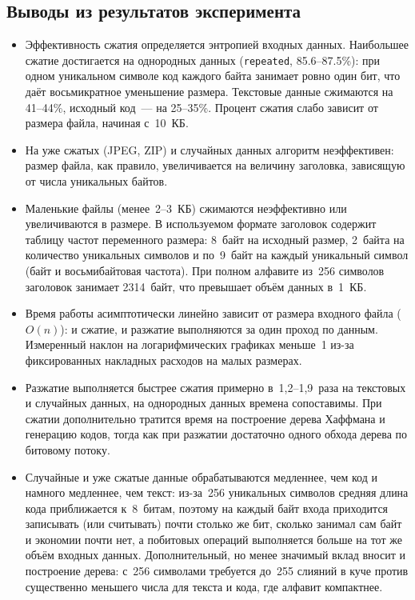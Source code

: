 \documentclass[a4paper]{article}
\begin{document}
\subsection{Выводы из результатов эксперимента}

\begin{itemize}
    \item Эффективность сжатия определяется энтропией входных данных.
    Наибольшее сжатие достигается на однородных данных
    (\texttt{repeated}, 85.6--87.5\%): при одном уникальном символе
    код каждого байта занимает ровно один бит, что даёт восьмикратное
    уменьшение размера. Текстовые данные сжимаются на 41--44\%,
    исходный код~--- на 25--35\%. Процент сжатия слабо зависит
    от размера файла, начиная с~10~КБ.

    \item На уже сжатых (JPEG, ZIP) и случайных данных алгоритм
    неэффективен: размер файла, как правило, увеличивается на величину заголовка,
    зависящую от числа уникальных байтов.

    \item Маленькие файлы (менее~2--3~КБ) сжимаются неэффективно
    или увеличиваются в размере. В используемом формате заголовок
    содержит таблицу частот переменного размера: 8~байт на исходный
    размер, 2~байта на количество уникальных символов и по~9~байт
    на каждый уникальный символ (байт и восьмибайтовая частота).
    При полном алфавите из~256 символов заголовок занимает
    2314~байт, что превышает объём данных в~1~КБ.

    \item Время работы асимптотически линейно зависит от размера
    входного файла ($O(n)$): и сжатие, и разжатие выполняются за
    один проход по данным. Измеренный наклон на логарифмических
    графиках меньше~1 из-за фиксированных накладных расходов
    на малых размерах.

    \item Разжатие выполняется быстрее сжатия примерно в~1,2--1,9~раза на текстовых
    и случайных данных, на однородных данных времена сопоставимы.
    При сжатии дополнительно тратится время на построение дерева
    Хаффмана и генерацию кодов, тогда как при разжатии достаточно
    одного обхода дерева по битовому потоку.
    
    \item Случайные и уже сжатые данные обрабатываются медленнее,
    чем код и намного медленнее, чем текст: из-за~256 уникальных
    символов средняя длина кода приближается к~8~битам, поэтому
    на каждый байт входа приходится записывать (или считывать)
    почти столько же бит, сколько занимал сам байт и экономии
    почти нет, а побитовых операций выполняется больше на тот же
    объём входных данных. Дополнительный, но менее значимый вклад
    вносит и построение дерева: с~256 символами требуется до~255
    слияний в куче против существенно меньшего числа для текста
    и кода, где алфавит компактнее.
\end{itemize}
\end{document}
